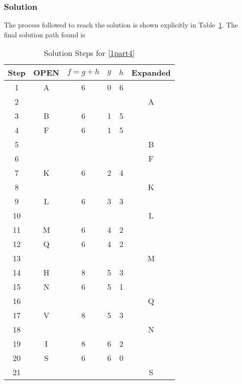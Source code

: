 \documentclass[12pt,letterpaper,titlepage]{article}
\begin{document}
\subsubsection[Answer]{Solution}
The process followed to reach the solution is shown explicitly in Table~\ref{tab:1part4}. The final solution path found is 
\begin{table}[htbp]
  \centering
  \caption{Solution Steps for \ref{1part4}}
    \begin{tabular}{cccccc}
    \toprule
    Step  & OPEN  & $f=g+h$     & $g$     & $h$     & Expanded \\
    \midrule
    1     & A     & 6     & 0     & 6     &  \\
    2     &       &       &       &       & A \\
    3     & B     & 6     & 1     & 5     &  \\
    4     & F     & 6     & 1     & 5     &  \\
    5     &       &       &       &       & B \\
    6     &       &       &       &       & F \\
    7     & K     & 6     & 2     & 4     &  \\
    8     &       &       &       &       & K \\
    9     & L     & 6     & 3     & 3     &  \\
    10    &       &       &       &       & L \\
    11    & M     & 6     & 4     & 2     &  \\
    12    & Q     & 6     & 4     & 2     &  \\
    13    &       &       &       &       & M \\
    14    & H     & 8     & 5     & 3     &  \\
    15    & N     & 6     & 5     & 1     &  \\
    16    &       &       &       &       & Q \\
    17    & V     & 8     & 5     & 3     &  \\
    18    &       &       &       &       & N \\
    19    & I     & 8     & 6     & 2     &  \\
    20    & S     & 6     & 6     & 0     &  \\
    21    &       &       &       &       & S \\
    \bottomrule
    \end{tabular}%
  \label{tab:1part4}%
\end{table}%
\end{document}
